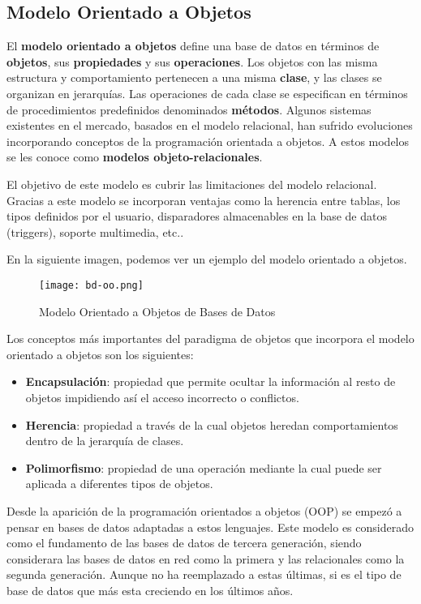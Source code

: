 \subsection{Modelo Orientado a Objetos}
El \textbf{modelo orientado a objetos} define una base de datos en términos de \textbf{objetos}, sus \textbf{propiedades} y sus \textbf{operaciones}. Los objetos con las misma estructura y comportamiento pertenecen a una misma \textbf{clase}, y las clases se organizan en jerarquías. Las operaciones de cada clase se especifican en términos de procedimientos predefinidos denominados \textbf{métodos}. Algunos sistemas existentes en el mercado, basados en el modelo relacional, han sufrido evoluciones incorporando conceptos de la programación orientada a objetos. A estos modelos se les conoce como \textbf{modelos objeto-relacionales}.

El objetivo de este modelo es cubrir las limitaciones del modelo relacional. Gracias a este modelo se incorporan ventajas como la herencia entre tablas, los tipos definidos por el usuario, disparadores almacenables en la base de datos (triggers), soporte multimedia, etc..

En la siguiente imagen, podemos ver un ejemplo del modelo orientado a objetos.

\begin{figure}[ht]
    \centering
    \texttt{[image: bd-oo.png]}
    \caption{Modelo Orientado a Objetos de Bases de Datos}
\end{figure}

Los conceptos más importantes del paradigma de objetos que incorpora el modelo orientado a objetos son los siguientes:

\begin{itemize}
    \item \textbf{Encapsulación}: propiedad que permite ocultar la información al resto de objetos impidiendo así el acceso incorrecto o conflictos.
    \item \textbf{Herencia}: propiedad a través de la cual objetos heredan comportamientos dentro de la jerarquía de clases.
    \item \textbf{Polimorfismo}: propiedad de una operación mediante la cual puede ser aplicada a diferentes tipos de objetos.
\end{itemize}

Desde la aparición de la programación orientados a objetos (OOP) se empezó a pensar en bases de datos adaptadas a estos lenguajes. Este modelo es considerado como el fundamento de las bases de datos de tercera generación, siendo considerara las bases de datos en red como la primera y las relacionales como la segunda generación. Aunque no ha reemplazado a estas últimas, si es el tipo de base de datos que más esta creciendo en los últimos años.

